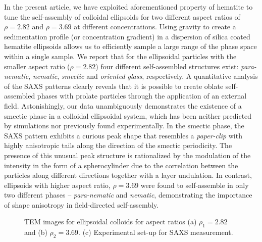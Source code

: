 \documentclass[aps,prl,preprint,superscriptaddress]{revtex4-1}
\begin{document}
In the present article, we have exploited aforementioned property of hematite to tune the self-assembly of colloidal ellipsoids for two different aspect ratios of $\rho = 2.82$ and $\rho = 3.69$ at different concentrations. Using gravity to create a sedimentation profile (or concentration gradient) in a dispersion of silica coated hematite ellipsoids allows us to efficiently sample a large range of the phase space within a single sample. We report that for the ellipsoidal particles with the smaller aspect ratio ($\rho=2.82$) four different self-assembled structures exist: \emph{para-nematic}, \emph{nematic}, \emph{smectic} and \emph{oriented glass}, respectively. A quantitative analysis of the SAXS patterns clearly reveals that it is possible to create oblate self-assembled phases with prolate particles through the application of an external field. Astonishingly, our data unambiguously demonstrates the existence of a smectic phase in a colloidal ellipsoidal system, which has been neither predicted by simulations nor previously found experimentally. In the smectic phase, the SAXS pattern exhibits a curious peak shape that resembles a \textit{paper-clip} with highly anisotropic tails along the direction of the smectic periodicity. The presence of this unusual peak structure is rationalized by the modulation of the intensity in the form of a spherocylinder due to the correlation between the particles along different directions together with a layer undulation. In contrast, ellipsoids with higher aspect ratio, $\rho=3.69$ were found to self-assemble in only two different phases -- \emph{para-nematic} and \emph{nematic}, demonstrating the importance of shape anisotropy in field-directed self-assembly.
\begin{figure}[!h]
\caption{TEM images for ellipsoidal colloids for aspect ratios (a) $\rho_1=2.82$ and (b) $\rho_2=3.69$. (c) Experimental set-up for SAXS measurement.}
\label{TEM}
\end{figure}
\end{document}
